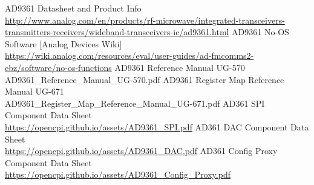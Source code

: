 \documentclass{article}
\begin{document}
\begin{thebibliography}{1}

 AD9361 Datasheet and Product Info \\
\url{http://www.analog.com/en/products/rf-microwave/integrated-transceivers-transmitters-receivers/wideband-transceivers-ic/ad9361.html}
 AD9361 No-OS Software [Analog Devices Wiki]\\
\url{https://wiki.analog.com/resources/eval/user-guides/ad-fmcomms2-ebz/software/no-os-functions}
 AD9361 Reference Manual UG-570\\
AD9361\_Reference\_Manual\_UG-570.pdf
 AD9361 Register Map Reference Manual UG-671\\
AD9361\_Register\_Map\_Reference\_Manual\_UG-671.pdf
 AD361 SPI Component Data Sheet \\
\url{https://opencpi.github.io/assets/AD9361_SPI.pdf}
 AD361 DAC Component Data Sheet \\
\url{https://opencpi.github.io/assets/AD9361_DAC.pdf}
 AD361 Config Proxy Component Data Sheet \\
\url{https://opencpi.github.io/assets/AD9361_Config_Proxy.pdf}

\end{thebibliography}
\pagebreak
\landscape
\end{document}
